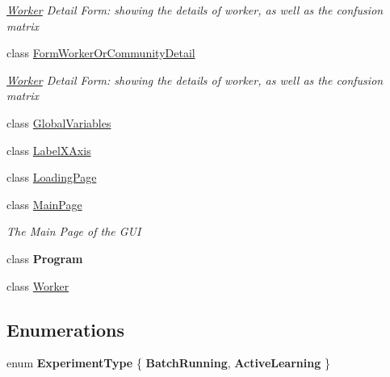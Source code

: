 \begin{DoxyCompactItemize}
\begin{DoxyCompactList}\small\item\em \hyperlink{class_acrive_crowd_g_u_i_1_1_worker}{Worker} Detail Form\+: showing the details of worker, as well as the confusion matrix \end{DoxyCompactList}\item 
class \hyperlink{class_acrive_crowd_g_u_i_1_1_form_worker_or_community_detail}{Form\+Worker\+Or\+Community\+Detail}
\begin{DoxyCompactList}\small\item\em \hyperlink{class_acrive_crowd_g_u_i_1_1_worker}{Worker} Detail Form\+: showing the details of worker, as well as the confusion matrix \end{DoxyCompactList}\item 
class \hyperlink{class_acrive_crowd_g_u_i_1_1_global_variables}{Global\+Variables}
\item 
class \hyperlink{class_acrive_crowd_g_u_i_1_1_label_x_axis}{Label\+X\+Axis}
\item 
class \hyperlink{class_acrive_crowd_g_u_i_1_1_loading_page}{Loading\+Page}
\item 
class \hyperlink{class_acrive_crowd_g_u_i_1_1_main_page}{Main\+Page}
\begin{DoxyCompactList}\small\item\em The Main Page of the G\+U\+I \end{DoxyCompactList}\item 
class {\bfseries Program}
\item 
class \hyperlink{class_acrive_crowd_g_u_i_1_1_worker}{Worker}
\end{DoxyCompactItemize}
\subsection*{Enumerations}
\begin{DoxyCompactItemize}
\item 
\hypertarget{namespace_acrive_crowd_g_u_i_ab9536a367d7c08e6aa44b74549a66fbf}{}enum {\bfseries Experiment\+Type} \{ {\bfseries Batch\+Running}, 
{\bfseries Active\+Learning}
 \}\label{namespace_acrive_crowd_g_u_i_ab9536a367d7c08e6aa44b74549a66fbf}

\end{DoxyCompactItemize}
